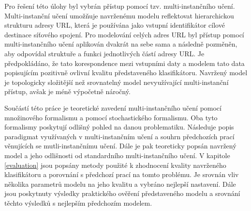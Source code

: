 Pro řešení této úlohy byl vybrán přístup pomocí tzv. multi-instančního učení. Multi-instanční učení umožňuje navrženému modelu reflektovat hierarchickou strukturu adresy URL, která je používána jako vstupní identifikátor cílové destinace síťového spojení. Pro modelování celých adres URL byl přístup pomocí multi-instančního učení aplikován dvakrát na sebe sama a následně pozměněn, aby odpovídal struktuře a funkci jednotlivých částí adresy URL. Je předpokládáno, že tato korespondence mezi vstupními daty a modelem tato data popisujícím pozitivně ovlivní kvalitu představeného klasifikátoru. Navržený model je topologicky složitější než srovnatelný model nevyužívající multi-instanční přístup, avšak je méně výpočetně náročný.

Součástí této práce je teoretické zavedení multi-instančního učení pomocí množinového formalismu a pomocí stochastického formalismu. Oba tyto formalismy poskytují odlišný pohled na danou problematiku. Následuje popis paradigmat využívaných v multi-instančním učení a souhrn předchozích prací věnujících se mutli-instančnímu učení. Dále je pak teoreticky popsán navržený model a jeho odlišnosti od standardního multi-instančního učení. V kapitole \ref{evaluation} jsou popsány metody použité k zhodnocení kvality navrženého klasifikátoru a porovnání s předchozí prací na tomto problému. Je srovnán vliv několika parametrů modelu na jeho kvalitu a vybráno nejlepší nastavení. Dále jsou poskytnuty výsledky praktického ověření představeného modelu a srovnání těchto výsledků s nejlepším předchozím modelem.
